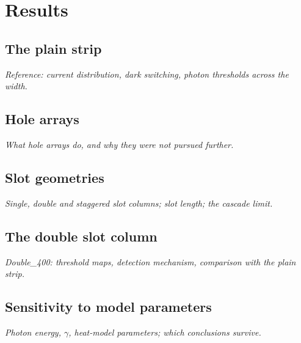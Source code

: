 \chapter{Results}
\label{chapter:results}

\section{The plain strip}
\label{sec:re-plain}
\emph{Reference: current distribution, dark switching, photon thresholds across the width.}

\section{Hole arrays}
\label{sec:re-holes}
\emph{What hole arrays do, and why they were not pursued further.}

\section{Slot geometries}
\label{sec:re-slots}
\emph{Single, double and staggered slot columns; slot length; the cascade limit.}

\section{The double slot column}
\label{sec:re-double400}
\emph{Double\_400: threshold maps, detection mechanism, comparison with the plain strip.}

\section{Sensitivity to model parameters}
\label{sec:re-sensitivity}
\emph{Photon energy, $\gamma$, heat-model parameters; which conclusions survive.}
